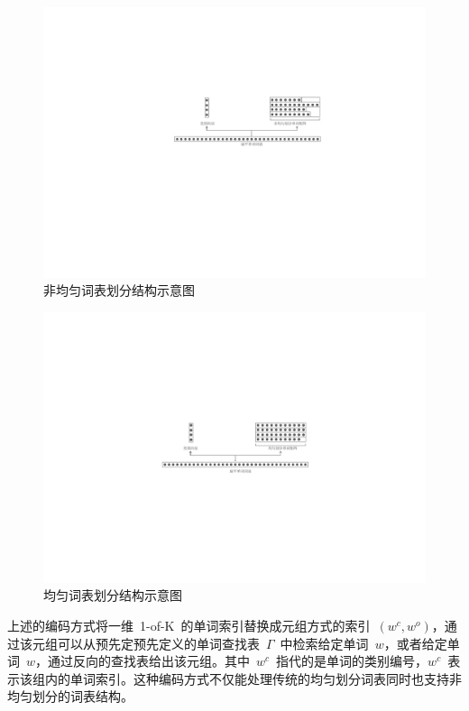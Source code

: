 \begin{figure}[!ht]
  \centering
\includegraphics[width=.9\linewidth]{./figures/chsm-simple.pdf}
\caption{非均匀词表划分结构示意图}\label{fig:unequal}
\end{figure}
\begin{figure}[!ht]
  \centering
\includegraphics[width=.9\linewidth]{./figures/chsm-simple2.pdf}
\caption{均匀词表划分结构示意图}\label{fig:equal}
\end{figure}

上述的编码方式将一维~1-of-K~的单词索引替换成元组方式的索引~$(w^c,w^o)$，通过该元组可以从预先定预先定义的单词查找表~$\Gamma $~中检索给定单词~$w$，或者给定单词~$w$，通过反向的查找表给出该元组。其中~$w^c$~指代的是单词的类别编号，$w^c$~表示该组内的单词索引。这种编码方式不仅能处理传统的均匀划分词表同时也支持非均匀划分的词表结构。


